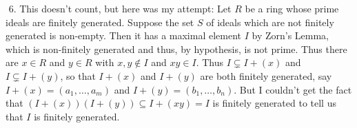 \documentclass[11pt]{article}
\begin{document}
%
%

$\text{}$\hline
\vskip0.3in
\num{6.} This doesn't count, but here was my attempt: Let $R$ be a ring whose prime ideals are finitely generated. Suppose the set $S$ of ideals which are not finitely generated is non-empty. Then it has a maximal element $I$ by Zorn's Lemma, which is non-finitely generated and thus, by hypothesis, is not prime. Thus there are $x\in R$ and $y\in R$ with $x,y\notin I$ and $xy\in I$. Thus $I\subsetneq I+(x)$ and $I\subsetneq I+(y)$, so that $I+(x)$ and $I+(y)$ are both finitely generated, say $I+(x)=(a_1,\ldots,a_m)$ and $I+(y)=(b_1,\ldots,b_n)$. But I couldn't get the fact that $(I+(x))(I+(y))\subseteq I+(xy)=I$ is finitely generated to tell us that $I$ is finitely generated.        \\
\end{document}
